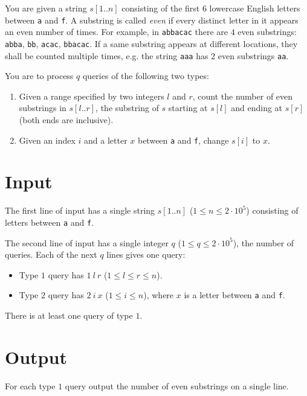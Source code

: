 
You are given a string $s[1..n]$ consisting of the first $6$ lowercase English letters between {\tt a} and {\tt f}.
A substring is called {\it even} if every distinct letter in it appears an even number of times.
For example, in {\tt abbacac} there are $4$ even substrings: {\tt abba}, {\tt bb}, {\tt acac}, {\tt bbacac}.
If a same substring appears at different locations, they shall be counted multiple times,
e.g. the string {\tt aaa} has $2$ even substrings {\tt aa}.

You are to process $q$ queries of the following two types:
\begin{enumerate}
\item Given a range specified by two integers $l$ and $r$, count the number of even substrings in $s[l..r]$,
the substring of $s$ starting at $s[l]$ and ending at $s[r]$ (both ends are inclusive).
\item Given an index $i$ and a letter $x$ between {\tt a} and {\tt f}, change $s[i]$ to $x$.
\end{enumerate}

\section*{Input}
The first line of input has a single string $s[1..n]$ ($1 \leq n \leq 2 \cdot 10^5$) consisting of letters between {\tt a} and {\tt f}.

\noindent The second line of input has a single integer $q$ ($1 \leq q \leq 2 \cdot 10^5$), the number of queries.
Each of the next $q$ lines gives one query:
\begin{itemize}
\item Type $1$ query has $1~l~r$ ($1 \leq l \leq r \leq n$).
\item Type $2$ query has $2~i~x$ ($1 \leq i \leq n$), where $x$ is a letter between {\tt a} and {\tt f}.
\end{itemize}
There is at least one query of type $1$.

\section*{Output}
For each type $1$ query output the number of even substrings on a single line.
